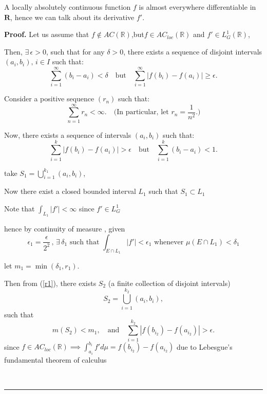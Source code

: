 \documentclass[10pt,a4paper]{amsart}
\newenvironment{proof}[1][Proof]{\noindent\textbf{#1.} }{\
\rule{0.5em}{0.5em}}
\begin{document}
\begin{remark}
A locally absolutely continuous function $f$ is almost everywhere differentiable in $\mathbf{R}$, hence we can talk about its derivative $f'$.
\end{remark}

 \begin{proof}
Let us assume that $f\notin AC(\mathbb{R})$,but$f\in AC_{loc}(\mathbb{R}) $ and  $f' \in L^1_G(\mathbb{R})$, 

Then, $\exists \, \epsilon > 0$, such that for any $\delta > 0$, there exists a sequence of disjoint intervals $(a_i, b_i), \, i \in I$ such that:
\begin{equation}\label{r1}
\sum_{i=1}^{\infty} (b_i - a_i) < \delta \quad \text{but} \quad \sum_{i=1}^{\infty} \left| f(b_i)-f(a_i)  \right| \geq \epsilon.
\end{equation}

Consider a positive sequence $(r_n)$ such that:
\[
\sum_{n=1}^{\infty} r_n < \infty. \quad \text{(In particular, let } r_n = \frac{1}{n^2} \text{.)}
\]

Now, there exists a sequence of intervals $(a_i, b_i)$ such that:
\[
\sum_{i=1}^{k} \left| f(b_i)-f(a_i) \right| > \epsilon \quad \text{but} \quad \sum_{i=1}^{k} (b_i - a_i) < 1.
\]

take $S_1 = \bigcup_{i=1}^{k_1} (a_i, b_i)$, 

Now there exist a closed bounded interval $L_1$
such that $S_1\subset L_1$

Note that $\int_{L_1} |f'| < \infty$ since $f' \in L^1_G$

hence by continuity of measure , given 
\begin{equation}\label{r2}
\epsilon_1 =\frac{\epsilon}{2^2}\,,\,
\exists\,\delta_1 \text{ such that }\int_{E\cap L_1} |f'| < \epsilon_1 
\text{ whenever }\mu(E\cap L_1 ) <\delta_1
\end{equation}

let $m_1 = \min(\delta_1, r_1)$.

Then from (\ref{r1}), there exists $S_2$ (a finite collection of disjoint intervals)
\[
S_2 = \bigcup_{i=1}^{k_2} (a_i, b_i),
\]
such that 
\[
m(S_2) < m_1, \quad \text{and} \quad \sum_{i=1}^{k_2} \left| f(b_{i_2}) - f(a_{i_2})\right| > \epsilon.
\]
since $ f\in AC_{loc}(\mathbb{R}) \implies\int_{a_i}^{b_i} f' d\mu =  f(b_{i_2}) - f(a_{i_2})$
due to Lebesgue's fundamental theorem of calculus 


\end{proof}
\end{document}
